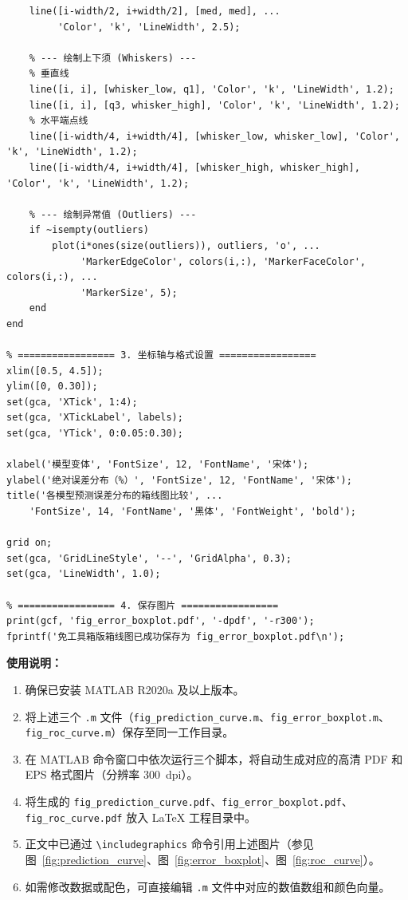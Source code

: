 \documentclass[twocolumn,a4paper]{ctexart}
\numberwithin{equation}{section}
\begin{document}
\begin{lstlisting}[caption={各模型预测误差分布箱线图绘图代码},label={lst:boxplot}]
    % --- 绘制中位线 (Median) ---
    line([i-width/2, i+width/2], [med, med], ...
         'Color', 'k', 'LineWidth', 2.5);
         
    % --- 绘制上下须 (Whiskers) ---
    % 垂直线
    line([i, i], [whisker_low, q1], 'Color', 'k', 'LineWidth', 1.2);
    line([i, i], [q3, whisker_high], 'Color', 'k', 'LineWidth', 1.2);
    % 水平端点线
    line([i-width/4, i+width/4], [whisker_low, whisker_low], 'Color', 'k', 'LineWidth', 1.2);
    line([i-width/4, i+width/4], [whisker_high, whisker_high], 'Color', 'k', 'LineWidth', 1.2);
    
    % --- 绘制异常值 (Outliers) ---
    if ~isempty(outliers)
        plot(i*ones(size(outliers)), outliers, 'o', ...
             'MarkerEdgeColor', colors(i,:), 'MarkerFaceColor', colors(i,:), ...
             'MarkerSize', 5);
    end
end

% ================= 3. 坐标轴与格式设置 =================
xlim([0.5, 4.5]);
ylim([0, 0.30]);
set(gca, 'XTick', 1:4);
set(gca, 'XTickLabel', labels);
set(gca, 'YTick', 0:0.05:0.30);

xlabel('模型变体', 'FontSize', 12, 'FontName', '宋体');
ylabel('绝对误差分布（%）', 'FontSize', 12, 'FontName', '宋体');
title('各模型预测误差分布的箱线图比较', ...
    'FontSize', 14, 'FontName', '黑体', 'FontWeight', 'bold');

grid on;
set(gca, 'GridLineStyle', '--', 'GridAlpha', 0.3);
set(gca, 'LineWidth', 1.0);

% ================= 4. 保存图片 =================
print(gcf, 'fig_error_boxplot.pdf', '-dpdf', '-r300');
fprintf('免工具箱版箱线图已成功保存为 fig_error_boxplot.pdf\n');
\end{lstlisting}

\vspace{1\baselineskip}
\noindent\textbf{使用说明：}
\begin{enumerate}
    \item 确保已安装 MATLAB R2020a 及以上版本。
    \item 将上述三个 \texttt{.m} 文件（\texttt{fig\_prediction\_curve.m}、\texttt{fig\_error\_boxplot.m}、\texttt{fig\_roc\_curve.m}）保存至同一工作目录。
    \item 在 MATLAB 命令窗口中依次运行三个脚本，将自动生成对应的高清 PDF 和 EPS 格式图片（分辨率 300~dpi）。
    \item 将生成的 \texttt{fig\_prediction\_curve.pdf}、\texttt{fig\_error\_boxplot.pdf}、\texttt{fig\_roc\_curve.pdf} 放入 LaTeX 工程目录中。
    \item 正文中已通过 \texttt{\textbackslash includegraphics} 命令引用上述图片（参见图~\ref{fig:prediction_curve}、图~\ref{fig:error_boxplot}、图~\ref{fig:roc_curve}）。
    \item 如需修改数据或配色，可直接编辑 \texttt{.m} 文件中对应的数值数组和颜色向量。
\end{enumerate}
\end{document}
